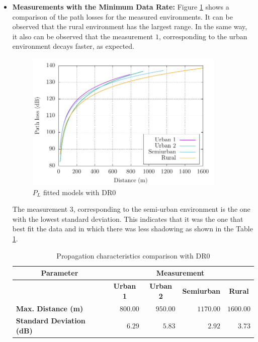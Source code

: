 \begin{itemize}

\item \textbf{Measurements with the Minimum Data Rate:} Figure \ref{fig:allfitteddr0} shows a comparison of the path losses for the measured environments. It can be observed that the rural environment has the largest range. In the same way, it also can be observed that the measurement $1$, corresponding to the urban environment decays faster, as expected.

\begin{figure}[h!]
  \centering
  \includegraphics[width=0.9\textwidth]{Figure8}
  \caption{$P_L$ fitted models with DR$0$}
  \label{fig:allfitteddr0}
\end{figure}

The measurement $3$, corresponding to the semi-urban environment is the one with the lowest standard deviation. This indicates that it was the one that best fit the data and in which there was less shadowing as shown in the Table \ref{tab:propagationcomparisondr0}.

\begin{table}[h!]
\centering
\caption{Propagation characteristics comparison with DR$0$}
\label{tab:propagationcomparisondr0}
\begin{tabular}{@{}lrrrr@{}}
\toprule
\multicolumn{1}{c}{\textbf{Parameter}} & \multicolumn{4}{c}{\textbf{Measurement}}                                                                                          \\ \midrule
\textbf{}                              & \multicolumn{1}{c}{\textbf{Urban 1}} & \multicolumn{1}{c}{\textbf{Urban 2}} & \multicolumn{1}{c}{\textbf{Semiurban}} & \multicolumn{1}{c}{\textbf{Rural}} \\
\textbf{Max. Distance (m)}             & $800.00$                            & $950.00$                            & $1170.00$                           & $1600.00$                           \\
\textbf{Standard Deviation (dB)}       & $6.29$                           & $5.83$                           & $2.92$                           & $3.73$                           \\ \bottomrule
\end{tabular}
\end{table}



\end{itemize}
